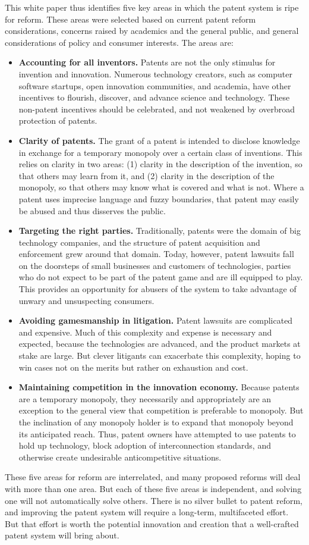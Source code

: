 \documentclass[11pt,twocolumn,titlepage]{article}
\begin{document}
This white paper thus identifies five key areas in which the patent system is
ripe for reform. These areas were selected based on current patent reform
considerations, concerns raised by academics and the general public, and general
considerations of policy and consumer interests. The areas are:
\begin{itemize}
\item\textbf{Accounting for all inventors.} Patents are not the only stimulus
for invention and innovation. Numerous technology creators, such as computer
software startups, open innovation communities, and academia, have other
incentives to flourish,
discover, and advance science and technology. These
non-patent incentives should be celebrated, and not weakened by
overbroad protection of patents.
\item\textbf{Clarity of patents.} The grant of a patent is intended to disclose
knowledge in exchange for a temporary monopoly over a certain class of
inventions. This relies on clarity in two areas: (1) clarity in the description
of the invention, so that others may learn from it, and (2) clarity in the
description of the monopoly, so that others may know what is covered and what is
not. Where a patent uses imprecise language and fuzzy boundaries, that patent
may easily be abused and thus disserves the public.
\item\textbf{Targeting the right parties.} Traditionally, patents were the
domain of big technology companies, and the structure of patent acquisition and
enforcement grew around that domain. Today, however, patent lawsuits fall on the
doorsteps of small businesses and customers of technologies, parties who do not
expect to be part of the patent game and are ill equipped to play. This provides
an opportunity for abusers of the system to take advantage of unwary and
unsuspecting consumers.
\item\textbf{Avoiding gamesmanship in litigation.} Patent lawsuits are
complicated and expensive. Much of this complexity and expense is necessary and
expected, because the technologies are advanced, and the product markets
at stake are large. But clever litigants can exacerbate this complexity, hoping
to win cases not on the merits but rather on exhaustion and cost.
\item\textbf{Maintaining competition in the innovation economy.} Because patents
are a temporary monopoly, they necessarily and appropriately are an exception to
the general view that competition is preferable to monopoly. But the inclination
of any monopoly holder is to expand that monopoly beyond its anticipated reach.
Thus, patent owners have attempted to use patents to hold up technology,
block adoption of interconnection standards, and otherwise create undesirable
anticompetitive situations.
\end{itemize}
These five areas for reform are interrelated, and many proposed reforms will
deal with more than one area. But each of these five areas is independent, and
solving one will not automatically solve others. There is no
silver bullet to patent reform, and improving the patent system will require a
long-term, multifaceted effort. But that effort is worth the potential
innovation and creation that a well-crafted patent system will bring about.
\end{document}
